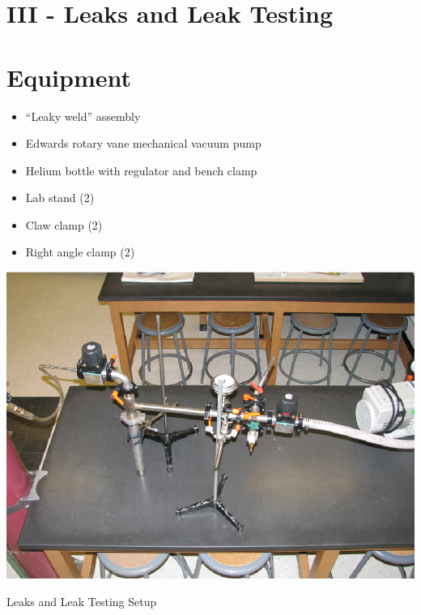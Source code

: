 \section{III - Leaks and Leak Testing}

\section{Equipment}

\begin{minipage}[t]{0.5\textwidth}
\begin{itemize}[noitemsep]
\item ``Leaky weld'' assembly
\item Edwards rotary vane mechanical vacuum pump
\item Helium bottle with regulator and bench clamp
\end{itemize}
\end{minipage}
\begin{minipage}[t]{0.5\textwidth}
\begin{itemize}[noitemsep]
\item Lab stand (2)
\item Claw clamp (2)
\item Right angle clamp (2)
\end{itemize}
\end{minipage}

\begin{marginfigure}
\includegraphics{Leaks-and-Leak-Testing-Table9.eps}
\caption{Leaks and Leak Testing Setup}
\label{fig:VACsetup3}
\end{marginfigure}


